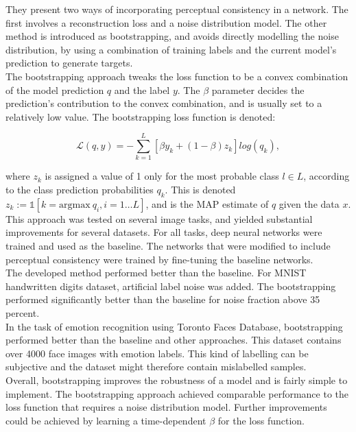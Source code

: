 They present two ways of incorporating perceptual consistency in a network. The first involves a reconstruction loss and a noise distribution model. The other method is introduced as bootstrapping, and avoids directly modelling the noise distribution, by using a combination of training labels and the current model's prediction to generate targets.\\

The bootstrapping approach tweaks the loss function to be a convex combination of the model prediction $q$ and the label $y$. The $\beta$ parameter decides the prediction's contribution to the convex combination, and is usually set to a relatively low value. The bootstrapping loss function is denoted:

$$\mathcal{L}(q,y) = - \sum\limits_{k=1}^L [\beta y_k + (1-\beta)z_k]log(q_k),$$

where $z_k$ is assigned a value of 1 only for the most probable class $l \in L$, according to the class prediction probabilities $q_k$. This is denoted $z_k := \mathbb{1}[k = \text{argmax}\ q_i, i=1\dots L]$, and is the \ac{MAP} estimate  of $q$ given the data $x$. \\

This approach was tested on several image tasks, and yielded substantial improvements for several datasets. For all tasks, deep neural networks were trained and used as the baseline. The networks that were modified to include perceptual consistency were trained by fine-tuning the baseline networks. \\

The developed method performed better than the baseline. For MNIST handwritten digits dataset, artificial label noise was added. The bootstrapping performed significantly better than the baseline for noise fraction above 35 percent.\\

In the task of emotion recognition using Toronto Faces Database, bootstrapping performed better than the baseline and other approaches. This dataset contains over 4000 face images with emotion labels. This kind of labelling can be subjective and the dataset might therefore contain mislabelled samples. \\

Overall, bootstrapping improves the robustness of a model and is fairly simple to implement. The bootstrapping approach achieved comparable performance to the loss function that requires a noise distribution model. Further improvements could be achieved by learning a time-dependent $\beta$ for the loss function.


